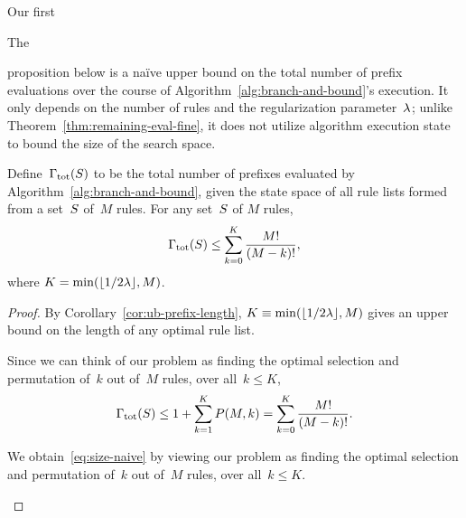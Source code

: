 \begin{arxiv}
Our first
\end{arxiv}
\begin{kdd}
The
\end{kdd}
proposition below is a na\"ive upper bound on
the total number of prefix evaluations over the course of
Algorithm~\ref{alg:branch-and-bound}'s execution.
%
It only depends on the number of rules and
the regularization parameter~${\lambda}$;
\ie unlike Theorem~\ref{thm:remaining-eval-fine},
it does not utilize algorithm execution state to
bound the size of the search space.

\begin{proposition}
\label{thm:ub-total-eval}
Define~${\Gamma_{\textnormal{tot}}}(S)$ to be the total number of prefixes
evaluated by Algorithm~\ref{alg:branch-and-bound}, given the state space of
all rule lists formed from a set~$S$ of~$M$ rules.
%
For any set~$S$ of $M$ rules,
\begin{align}
\TotalRemaining(\RuleSet) \le \sum_{k=0}^K \frac{M!}{(M - k)!},
\label{eq:size-naive}
\end{align}
where ${K = \min(\lfloor 1/2 {\lambda} \rfloor, M)}$.
\end{proposition}

\begin{proof}
By Corollary~\ref{cor:ub-prefix-length},
${K \equiv \min(\lfloor 1 / 2 {\lambda} \rfloor, M)}$
gives an upper bound on the length of any optimal rule list.
%
\begin{arxiv}
Since we can think of our problem as finding the optimal
selection and permutation of~$k$ out of~$M$ rules,
over all~${k \le K}$,
\begin{align}
\TotalRemaining(\RuleSet) \le 1 + \sum_{k=1}^K P(M, k)
= \sum_{k=0}^K \frac{M!}{(M - k)!}.
\end{align}
\end{arxiv}
\begin{kdd}
We obtain~\eqref{eq:size-naive} by viewing
our problem as finding the optimal
selection and permutation of~$k$ out of~$M$ rules,
over all~${k \le K}$.
\end{kdd}
\end{proof}

